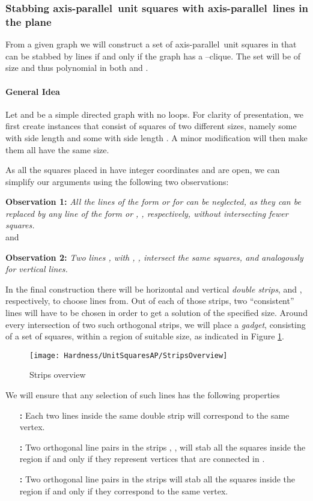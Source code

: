 \documentclass[12pt]{article}
\newcommand{\ap}{a.p.\ }
\renewcommand{\ap}{axis-parallel\ }
\begin{document}
\subsubsection{Stabbing \ap unit squares with \ap lines in the
  plane}\label{sssec:wonehardUnitSquaresAP}

From a given graph  we will construct a set  of \ap unit squares in  that can be stabbed by  lines if and only if the graph has a --clique. The set will be of size  and thus polynomial in both  and .

\paragraph{General Idea}
Let  and  be a simple directed graph with no loops. For clarity of presentation, we first create instances  that consist of squares of two different sizes, namely some with side length  and some with side length . A minor modification will then make them all have the same size. 

As all the squares placed in  have integer coordinates and are open, we can simplify our arguments using the following two observations:

\textbf{Observation 1:}
\emph{All the lines of the form  or  for  can be neglected, as they can be replaced by any line of the form  or , , respectively, without intersecting fewer squares.
}\\
and

\textbf{Observation 2:}
\emph{Two lines ,  with , , intersect the same squares, and analogously for vertical lines.}

In the final construction there will be  horizontal and  vertical \textit{double strips},  and , respectively, to choose lines from. Out of each of those strips, two ``consistent'' lines will have to be chosen in order to get a solution of the specified size. Around every intersection of two such orthogonal strips, we will place a \textit{gadget}, consisting of a set of squares, within a region of suitable size, as indicated in Figure \ref{fig:StripsOverview}.
\begin{figure}[ht]
	\centering
		\texttt{[image: Hardness/UnitSquaresAP/StripsOverview]}
	\caption{Strips overview}
	\label{fig:StripsOverview}
\end{figure}
We will ensure that any selection of such  lines has the following properties 
\begin{itemize}
	\item[\textbf{:}] Each two lines inside the same double strip will correspond to the same vertex.
	\item[\textbf{:}] Two orthogonal line pairs in the strips , , will stab all the squares inside the region  if and only if they represent vertices that are connected in .
	\item[\textbf{:}] Two orthogonal line pairs in the strips  will stab all the squares inside the region  if and only if they correspond to the same vertex.
\end{itemize}
\end{document}
